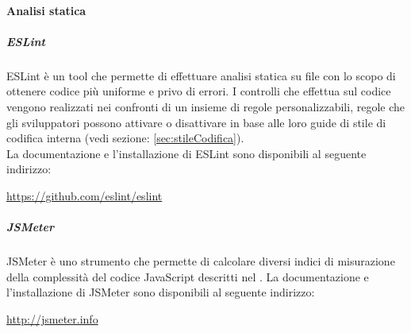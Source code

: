 		\paragraph{Analisi statica}
		\subparagraph{ESLint} \label{sec:ESLint}
		ESLint è un tool che permette di effettuare analisi statica su file  con lo scopo di ottenere codice più uniforme e privo di errori. I controlli che effettua sul codice vengono realizzati nei confronti di un insieme di regole personalizzabili, regole che gli sviluppatori possono attivare o disattivare in base alle loro guide di stile di codifica interna (vedi sezione: \ref{sec:stileCodifica}). \\
		La documentazione e l'installazione di ESLint sono disponibili al seguente indirizzo:
		\begin{center}
			\url{https://github.com/eslint/eslint}
		\end{center}
		\subparagraph{JSMeter} \label{sec:JSMeter}
		JSMeter è uno strumento che permette di calcolare diversi indici di misurazione della complessità del codice JavaScript descritti nel \pdqv.
		La documentazione e l'installazione di JSMeter sono disponibili al seguente indirizzo:
		\begin{center}
			\url{http://jsmeter.info}
		\end{center}
